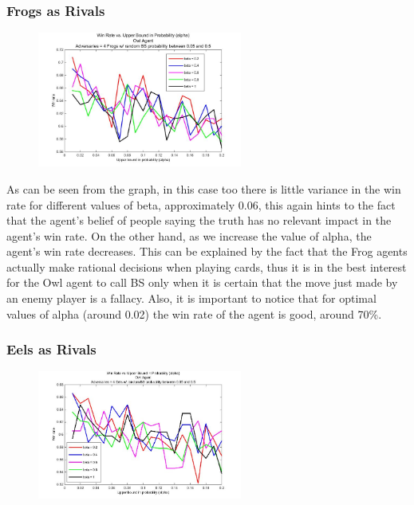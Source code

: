 \documentclass[a4paper,11pt]{article}
\begin{document}
\subsubsection{Frogs as Rivals}

\begin{figure}
\includegraphics[width=0.6\textwidth]{owl_vs_frog_upperBoundProb}
\caption{}
\end{figure}

As can be seen from the graph, in this case too there is little variance in the win rate for different values of beta, approximately 0.06, this again hints to the fact that the agent’s belief of people saying the truth has no relevant impact in the agent’s win rate. On the other hand, as we increase the value of alpha, the agent’s win rate decreases. This can be explained by the fact that the Frog agents actually make rational decisions when playing cards, thus it is in the best interest for the Owl agent to call BS only when it is certain that the move just made by an enemy player is a fallacy. Also, it is important to notice that for optimal values of alpha (around 0.02) the win rate of the agent is good, around 70\%.

\subsubsection{Eels as Rivals}

\begin{figure}
\includegraphics[width=0.6\textwidth]{owl_vs_eel_upperbBoundProb}
\caption{}
\end{figure}
\end{document}
